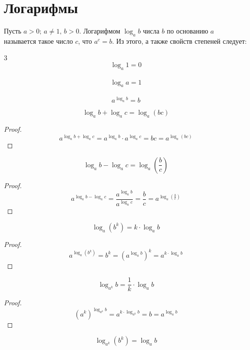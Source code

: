 \documentclass[12pt]{article}
\begin{document}
    \section{Логарифмы}
    \begin{definition}
        Пусть $a>0;\, a\neq 1,\,b>0$. Логарифмом $\log_ab$ числа $b$ по основанию $a$ называется такое число $c$, что $a^c=b$. Из этого, а также свойств степеней следует:
        \begin{center}
            \begin{multicols}{3}
                \[\log_a 1=0\]\\
                \[\log_a a=1\]\\
                \[a^{\log_a b}=b\]
            \end{multicols}
        \end{center}
    \end{definition}
    \begin{statement}
        $$\log_a b+\log_a c=\log_a(bc)$$
    \end{statement}
    \begin{proof}
        $$a^{\log_a b+\log_a c}=a^{\log_a b}\cdot a^{\log_a c}=bc=a^{\log_a(bc)}$$
    \end{proof}
    \begin{statement}
        $$\log_a b-\log_a c=\log_a \left(\frac{b}{c}\right)$$
    \end{statement}
    \begin{proof}
        $$a^{\log_a b-\log_a c}=\frac{a^{\log_a b}}{a^{\log_a c}}=\frac{b}{c}=a^{\log_a \left(\frac{b}{c}\right)}$$
    \end{proof}
    \begin{statement}
        $$\log_a \left(b^k\right)=k\cdot\log_a b$$
    \end{statement}
    \begin{proof}
        $$a^{\log_a \left(b^k\right)}=b^k=\left(a^{\log_a b}\right)^k=a^{k\cdot\log_a b}$$
    \end{proof}
    \begin{statement}
        $$\log_{a^k}b=\frac{1}{k}\cdot\log_a b$$
    \end{statement}
    \begin{proof}
        $$\left(a^k\right)^{\log_{a^k}b}=a^{k\cdot\log_{a^k} b}=b=a^{\log_a b}$$
    \end{proof}
    \setcounter{subsection}{4}
    \begin{consequence}
        $$\log_{a^k}\left(b^k\right)=\log_a b$$
    \end{consequence}
\end{document}
